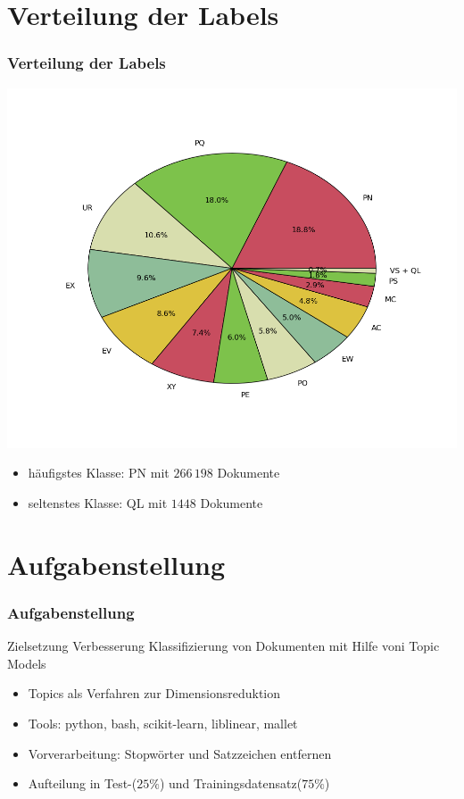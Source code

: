 \documentclass[12pt, xcolor=table]{beamer}
\begin{document}
\section{Verteilung der Labels}
\begin{frame}
    \frametitle{Verteilung der Labels}
    \begin{center}
        \includegraphics[scale=0.3]{figures/labels_fancy.png}
    \end{center}
    \begin{itemize}
        \item häufigstes Klasse: PN mit $266\, 198$ Dokumente
        \item seltenstes Klasse: QL mit $1448$ Dokumente
    \end{itemize}
\end{frame}

\section{Aufgabenstellung}
\begin{frame}
    \frametitle{Aufgabenstellung}
    \begin{block}{Zielsetzung}
        Verbesserung Klassifizierung von Dokumenten mit Hilfe voni Topic Models
    \end{block}
    \begin{itemize}
        \item Topics als Verfahren zur Dimensionsreduktion
        \item  Tools: python, bash, scikit-learn, liblinear, mallet
        \item  Vorverarbeitung: Stopwörter und Satzzeichen entfernen
        \item  Aufteilung in Test-($25 \%$) und Trainingsdatensatz($75 \%$)
    \end{itemize}
\end{frame}
\end{document}
